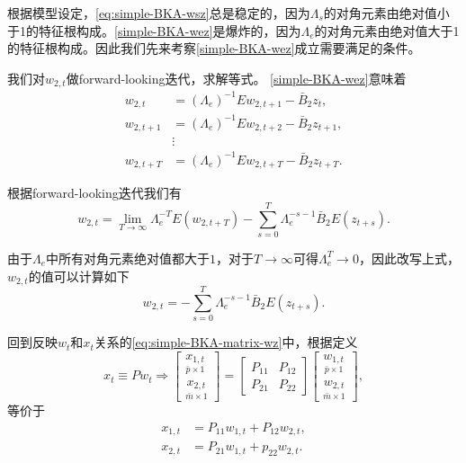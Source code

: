 根据模型设定，\eqref{eq:simple-BKA-wsz}总是稳定的，因为$\Lambda_s$的对角元素由绝对值小于1的特征根构成。\eqref{simple-BKA-wez}是爆炸的，因为$\Lambda_e$的对角元素由绝对值大于1的特征根构成。因此我们先来考察\eqref{simple-BKA-wez}成立需要满足的条件。

我们对$w_{2,t}$做forward-looking迭代，求解等式。
\eqref{simple-BKA-wez}意味着
  \begin{align*}
    w_{2,t} &= (\Lambda_e)^{-1} E w_{2,t+1} - \bar{B}_{2} z_t, \\
    w_{2,t+1} &= (\Lambda_e)^{-1} E w_{2,t+2} - \bar{B}_{2} z_{t+1},\\
    &\vdots \\
    w_{2,t+T} &= (\Lambda_e)^{-1} E w_{2,t+T} - \bar{B}_{2} z_{t+T}.
  \end{align*}

根据forward-looking迭代我们有
\begin{equation}
  w_{2,t} = \lim_{T \rightarrow \infty} \Lambda_e^{-T} E (w_{2,t+T}) - \sum_{s=0}^{T} \Lambda_{e}^{-s-1} \bar{B}_2 E(z_{t+s}).
\end{equation}

由于$\Lambda_{e}$中所有对角元素绝对值都大于$1$，对于$T \rightarrow \infty$可得$\Lambda_{e}^{T} \rightarrow 0$，因此改写上式，$w_{2,t}$的值可以计算如下
\begin{equation}
  \label{eq:simple-BKA-forward-looking-iteration-w}
    w_{2,t} = - \sum_{s=0}^{T} \Lambda_{e}^{-s-1} \bar{B}_2 E(z_{t+s}).
\end{equation}

回到反映$w_t$和$x_t$关系的\eqref{eq:simple-BKA-matrix-wz}中，根据定义
\begin{equation*}
  x_t \equiv P w_t  \Rightarrow \begin{bmatrix}
  \underset{\bar{p} \times 1}{x_{1,t}} \\
  \underset{\bar{m} \times 1}{x_{2,t}}
\end{bmatrix} = \begin{bmatrix}
  P_{11} & P_{12} \\
  P_{21} & P_{22}
\end{bmatrix} \begin{bmatrix}
\underset{\bar{p} \times 1}{w_{1,t}} \\
\underset{\bar{m} \times 1}{w_{2,t}}
\end{bmatrix},
\end{equation*}
等价于
\begin{subequations}
\begin{align}
  \label{eq:simple-BKA-xwp-1}
  x_{1,t} &= P_{11} w_{1,t} + P_{12} w_{2,t}, \\
  \label{eq:simple-BKA-xwp-2}
  x_{2,t} &= P_{21} w_{1,t} + p_{22} w_{2,t}.
\end{align}
\end{subequations}

